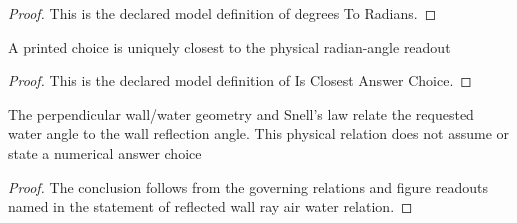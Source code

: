 \begin{proof}
  This is the declared model definition of degrees To Radians.
\end{proof}
\begin{definition}
  \label{def:physics:phyx-mini-0103:phyxminiproblems-problemphyxmini0103-isclosestanswerchoice}
  A printed choice is uniquely closest to the physical radian-angle readout
\end{definition}
\begin{proof}
  This is the declared model definition of Is Closest Answer Choice.
\end{proof}
\begin{lemma}
  \label{lem:physics:phyx-mini-0103:phyxminiproblems-problemphyxmini0103-reflected-wall-ray-air-water-relation}
  The perpendicular wall/water geometry and Snell's law relate the requested water angle to the wall reflection angle. This physical relation does not assume or state a numerical answer choice
\end{lemma}
\begin{proof}
  The conclusion follows from the governing relations and figure readouts named in the statement of reflected wall ray air water relation.
\end{proof}
